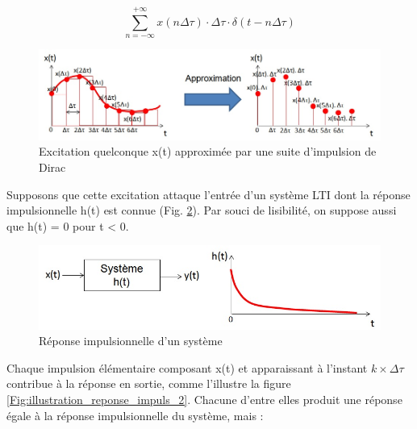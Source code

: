 \documentclass[]{report}
\begin{document}
	
	\begin{equation*}\label{}
	\sum_{n=-\infty}^{+\infty}x(n\Delta \tau) \cdot	\Delta \tau \cdot \delta (t-n\Delta \tau)	
	\end{equation*}
	
	\begin{figure}[h!]
		\centering
		\includegraphics[scale=0.5]{images/Approx_excitation_Dirac.jpg} 
		\caption{Excitation quelconque x(t) approximée par une suite d'impulsion de Dirac}	
		\label{Fig:Approx_excitation_Dirac}
	\end{figure}
	Supposons que cette excitation attaque l'entrée d'un système LTI dont la réponse impulsionnelle h(t) est connue (Fig. \ref{Fig:reponse_impuls_illustration}). Par souci de lisibilité, on suppose aussi que h(t) = 0 pour t < 0.
	\begin{figure}[h!]
		\centering
		\includegraphics[scale=0.5]{images/reponse_impuls_illustration.jpg} 
		\caption{Réponse impulsionnelle d'un système}	
		\label{Fig:reponse_impuls_illustration}
	\end{figure}	
	
	Chaque impulsion élémentaire composant x(t) et apparaissant à l'instant
	$ k \times \Delta \tau $ contribue à la réponse en sortie, comme l'illustre la figure \ref{Fig:illustration_reponse_impuls_2}. Chacune d'entre elles produit une réponse égale à la réponse impulsionnelle du système, mais :
	
\end{document}
